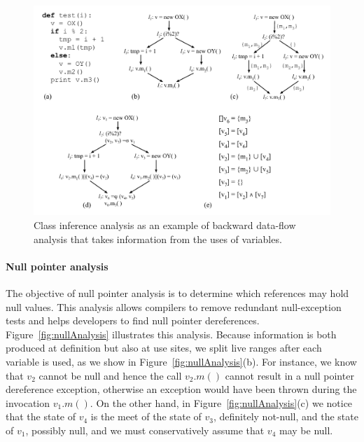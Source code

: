 \begin{figure}[t!]
\centering
\includegraphics[width=\linewidth]{classInference}
\caption{Class inference analysis as an example of backward data-flow analysis that takes information from the uses of variables.}
\label{fig:classInference}
\end{figure}


\paragraph{Null pointer analysis} The objective of null pointer analysis is to determine which references may hold null values.
This analysis allows compilers to remove redundant null-exception tests and helps developers to find null pointer dereferences.
Figure~\ref{fig:nullAnalysis} illustrates this analysis.
Because information is both produced at definition but also at use sites, we split live ranges after each variable is used, as we show in Figure~\ref{fig:nullAnalysis}(b).
For instance, we know that $v_2$ cannot be null and hence the call $v_2.m()$ cannot result in a null pointer dereference exception, otherwise an exception would have been thrown during the invocation $v_1.m()$.
On the other hand, in Figure~\ref{fig:nullAnalysis}(c) we notice that the state of $v_4$ is the meet of the state of $v_3$, definitely not-null, and the state of $v_1$, possibly null, and we must conservatively assume that $v_4$ may be null.


